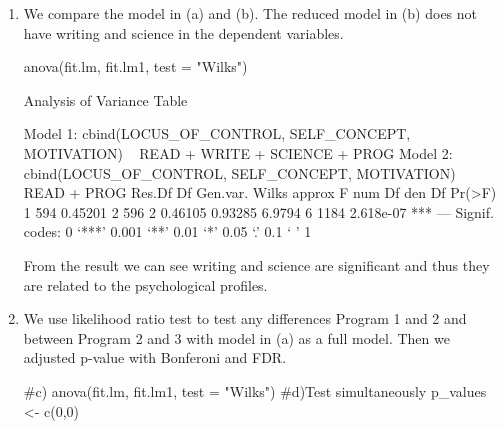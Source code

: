 \documentclass{article}
\begin{document}
\begin{enumerate}[leftmargin = 0 em, label = \arabic*., font = \bfseries]
\begin{enumerate}
\begin{rcode*}{fontsize = \footnotesize}
Multivariate Tests: READ
                 Df test stat approx F num Df den Df     Pr(>F)    
Pillai            1 0.1439298 33.28946      3    594 < 2.22e-16 ***
Wilks             1 0.8560702 33.28946      3    594 < 2.22e-16 ***
Hotelling-Lawley  1 0.1681286 33.28946      3    594 < 2.22e-16 ***
Roy               1 0.1681286 33.28946      3    594 < 2.22e-16 ***
---
Signif. codes:  0 ‘***’ 0.001 ‘**’ 0.01 ‘*’ 0.05 ‘.’ 0.1 ‘ ’ 1

------------------------------------------
 
Term: PROG 

Sum of squares and products for the hypothesis:
                 LOCUS_OF_CONTROL SELF_CONCEPT MOTIVATION
LOCUS_OF_CONTROL         5.652949      8.49380   13.37923
SELF_CONCEPT             8.493800     13.90261   20.98700
MOTIVATION              13.379228     20.98700   32.35107

Multivariate Tests: PROG
                 Df test stat approx F num Df den Df     Pr(>F)    
Pillai            2 0.1121308 11.78009      6   1190 7.2868e-13 ***
Wilks             2 0.8880617 12.10849      6   1188 3.0304e-13 ***
Hotelling-Lawley  2 0.1258310 12.43630      6   1186 1.2626e-13 ***
Roy               2 0.1240839 24.60996      3    595 5.0622e-15 ***
---
Signif. codes:  0 ‘***’ 0.001 ‘**’ 0.01 ‘*’ 0.05 ‘.’ 0.1 ‘ ’ 1
\end{rcode*}

\item 
We compare the model in (a) and (b). The reduced model in (b) does not have writing and science in the dependent variables.
\begin{rcode}
anova(fit.lm, fit.lm1, test = "Wilks")

Analysis of Variance Table

Model 1: cbind(LOCUS_OF_CONTROL, SELF_CONCEPT, MOTIVATION) ~ READ + WRITE + SCIENCE + PROG
Model 2: cbind(LOCUS_OF_CONTROL, SELF_CONCEPT, MOTIVATION) ~ READ + PROG
  Res.Df Df Gen.var.   Wilks approx F num Df den Df    Pr(>F)    
1    594     0.45201                                             
2    596  2  0.46105 0.93285   6.9794      6   1184 2.618e-07 ***
---
Signif. codes:  0 ‘***’ 0.001 ‘**’ 0.01 ‘*’ 0.05 ‘.’ 0.1 ‘ ’ 1
\end{rcode}
From the result we can see writing and science are significant and thus they are related to the psychological profiles.

\item 
We use likelihood ratio test to test any differences Program 1 and 2 and between Program 2 and 3 with model in (a) as a full model. Then we adjusted p-value with Bonferoni and FDR.
\begin{rcode}
#c) 
anova(fit.lm, fit.lm1, test = "Wilks")
#d)Test simultaneously 
p_values <- c(0,0)


\end{rcode}
\end{enumerate}
\end{enumerate}
\end{document}
